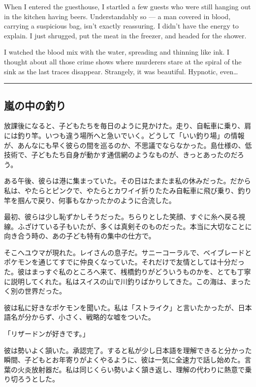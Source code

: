 \documentclass[
  letterpaper,
  oneside]{scrbook}
\begin{document}
When I entered the guesthouse, I startled a few guests who were still
hanging out in the kitchen having beers. Understandably so --- a man
covered in blood, carrying a suspicious bag, isn't exactly reassuring. I
didn't have the energy to explain. I just shrugged, put the meat in the
freezer, and headed for the shower.

I watched the blood mix with the water, spreading and thinning like ink.
I thought about all those crime shows where murderers stare at the
spiral of the sink as the last traces disappear. Strangely, it was
beautiful. Hypnotic, even\ldots{}

\begin{center}\rule{0.5\linewidth}{0.5pt}\end{center}

\subsection{嵐の中の釣り}\label{ux5d50ux306eux4e2dux306eux91e3ux308a}

放課後になると、子どもたちを毎日のように見かけた。走り、自転車に乗り、肩には釣り竿。いつも違う場所へと急いでいく。どうして「いい釣り場」の情報が、あんなにも早く彼らの間を巡るのか、不思議でならなかった。島仕様の、低技術で、子どもたち自身が動かす通信網のようなものが、きっとあったのだろう。

ある午後、彼らは港に集まっていた。その日はたまたま私の休みだった。だから私は、やたらとピンクで、やたらとカワイイ折りたたみ自転車に飛び乗り、釣り竿を掴んで戻り、何事もなかったかのように合流した。

最初、彼らは少し恥ずかしそうだった。ちらりとした笑顔、すぐに糸へ戻る視線。ふざけている子もいたが、多くは真剣そのものだった。本当に大切なことに向き合う時の、あの子ども特有の集中の仕方で。

そこへユウマが現れた。レイさんの息子だ。サニーコーラルで、ベイブレードとポケモンを通じてすでに仲良くなっていた。それだけで友情としては十分だった。彼はまっすぐ私のところへ来て、桟橋釣りがどういうものかを、とても丁寧に説明してくれた。私はスイスの山で川釣りばかりしてきた。この海は、まったく別の世界だった。

彼は私に好きなポケモンを聞いた。私は「ストライク」と言いたかったが、日本語名が分からず、小さく、戦略的な嘘をついた。

「リザードンが好きです。」

彼は勢いよく頷いた。承認完了。すると私が少し日本語を理解できると分かった瞬間、子どもとお年寄りがよくやるように、彼は一気に全速力で話し始めた。言葉の火炎放射器だ。私は同じくらい勢いよく頷き返し、理解の代わりに熱意で乗り切ろうとした。
\end{document}
